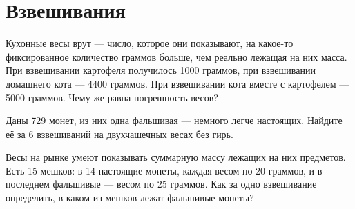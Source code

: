 \section{Взвешивания}

\begin{enumerate}
\itA Кухонные весы врут — число, которое они показывают, на какое-то фиксированное количество граммов больше, чем реально лежащая на них масса. При взвешивании картофеля получилось 1000 граммов, при взвешивании домашнего кота — 4400 граммов. При взвешивании кота вместе с картофелем — 5000 граммов. Чему же равна погрешность весов?

\itB Даны 729 монет, из них одна фальшивая — немного легче настоящих. Найдите её за 6 взвешиваний на двухчашечных весах без гирь.

\itC Весы на рынке умеют показывать суммарную массу лежащих на них предметов. Есть 15 мешков: в 14 настоящие монеты, каждая весом по 20 граммов, и в последнем фальшивые — весом по 25 граммов. Как за одно взвешивание определить, в каком из мешков лежат фальшивые монеты?
\end{enumerate}